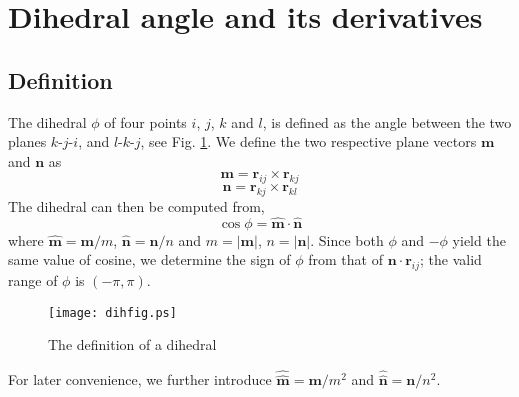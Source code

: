 \documentclass{article}
\begin{document}
\newcommand{\vct}[1]{\mathbf{#1}}
\newcommand{\vx}{\vct{x}}
\newcommand{\vy}{\vct{y}}
\newcommand{\vz}{\vct{z}}
\newcommand{\vm}{\vct{m}}
\newcommand{\vn}{\vct{n}}
\newcommand{\vr}{\vct{r}}
\newcommand{\vxh}{\hat{\vct{x}}}
\newcommand{\vyh}{\hat{\vct{y}}}
\newcommand{\vzh}{\hat{\vct{z}}}
\newcommand{\vmh}{\hat{\vct{m}}}
\newcommand{\vnh}{\hat{\vct{n}}}
\newcommand{\vrh}{\hat{\vct{r}}}
\newcommand{\vmhh}{\hat{\hat{\vct{m}}}}
\newcommand{\vnhh}{\hat{\hat{\vct{n}}}}
\newcommand{\diphi}{\nabla_i \phi}
\newcommand{\djphi}{\nabla_j \phi}
\newcommand{\dkphi}{\nabla_k \phi}
\newcommand{\dlphi}{\nabla_l \phi}

\section{Dihedral angle and its derivatives}

\subsection{Definition}

The dihedral $\phi$ of four points $i$, $j$, $k$ and $l$, 
is defined as the angle between the two planes 
$k$-$j$-$i$, and $l$-$k$-$j$, see Fig. \ref{dihfig}.
%
We define the two respective plane vectors $\vm$ and $\vn$ as
\begin{equation}
\vm = \vr_{ij} \times \vr_{kj}
\label{eq:m}
\end{equation}
%
\begin{equation}
\vn = \vr_{kj} \times \vr_{kl} 
\label{eq:n}
\end{equation}
%
The dihedral can then be computed from,
\begin{equation}
  \cos \phi = \vmh \cdot \vnh
  \label{eq:cosphi}
\end{equation}
%
where $\vmh = \vm/m$, $\vnh = \vn/n$
%
and $m = | \vm |$, $n = | \vn |$.
%
Since both $\phi$ and $-\phi$ yield the same value of cosine,
we determine the sign of $\phi$ from
that of $\vn \cdot \vr_{ij}$;
the valid range of $\phi$ is $(-\pi, \pi)$. 
%
\begin{figure}[h]
\begin{center}
\texttt{[image: dihfig.ps]}
\caption{\label{dihfig}The definition of a dihedral}
\end{center}
\end{figure}

For later convenience, we further introduce
$\vmhh = \vm/m^2$ and $\vnhh = \vn/n^2$.
\end{document}
